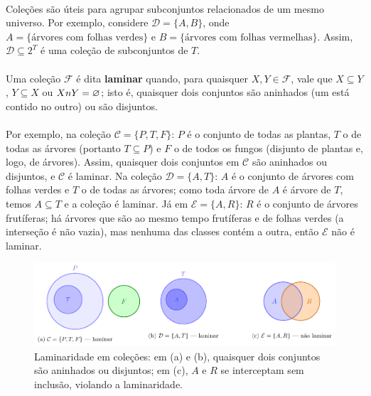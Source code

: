\documentclass[12pt,a4paper]{article}
\def\cap{\string n}%
\begin{document}
\paragraph{}
Coleções são úteis para agrupar subconjuntos relacionados de um mesmo universo. Por exemplo, considere \(\mathcal{D} = \{A, B\}\), onde \(A = \{\text{árvores com folhas verdes}\}\) e \(B = \{\text{árvores com folhas vermelhas}\}\). Assim, \(\mathcal{D} \subseteq 2^{T}\) é uma coleção de subconjuntos de \(T\).

\paragraph{}
Uma coleção \(\mathcal{F}\) é dita \textbf{laminar} quando, para quaisquer \(X, Y \in \mathcal{F}\), vale que \(X \subseteq Y\), \(Y \subseteq X\) ou \(X \cap Y = \varnothing\); isto é, quaisquer dois conjuntos são aninhados (um está contido no outro) ou são disjuntos.

\paragraph{}
Por exemplo, na coleção \(\mathcal{C} = \{P, T, F\}\): \(P\) é o conjunto de todas as plantas, \(T\) o de todas as árvores (portanto \(T\subseteq P\)) e \(F\) o de todos os fungos (disjunto de plantas e, logo, de árvores). Assim, quaisquer dois conjuntos em \(\mathcal{C}\) são aninhados ou disjuntos, e \(\mathcal{C}\) é laminar. Na coleção \(\mathcal{D} = \{A, T\}\): \(A\) é o conjunto de árvores com folhas verdes e \(T\) o de todas as árvores; como toda árvore de \(A\) é árvore de \(T\), temos \(A\subseteq T\) e a coleção é laminar. Já em \(\mathcal{E} = \{A, R\}\): \(R\) é o conjunto de árvores frutíferas; há árvores que são ao mesmo tempo frutíferas e de folhas verdes (a interseção é não vazia), mas nenhuma das classes contém a outra, então \(\mathcal{E}\) não é laminar.


\begin{figure}[H]
    \centering
    \includegraphics[width=0.9\linewidth]{figures/fig_laminaridade.pdf}

    \caption{Laminaridade em coleções: em (a) e (b), quaisquer dois conjuntos são aninhados ou disjuntos; em (c), $A$ e $R$ se interceptam sem inclusão, violando a laminaridade.}
    \label{fig:laminaridade}\end{figure}
\end{document}
